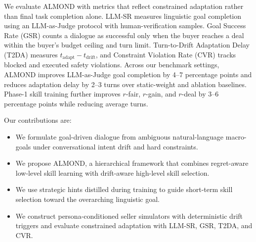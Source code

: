 We evaluate ALMOND with metrics that reflect constrained adaptation rather
than final task completion alone. LLM-SR measures linguistic goal completion
using an LLM-as-Judge protocol with human-verification samples. Goal Success
Rate (GSR) counts a dialogue as successful only when the buyer reaches a deal
within the buyer's budget ceiling and turn limit. Turn-to-Drift Adaptation
Delay (T2DA) measures $t_{\mathrm{adapt}}-t_{\mathrm{drift}}$, and Constraint
Violation Rate (CVR) tracks blocked and executed safety violations. Across our
benchmark settings, ALMOND improves LLM-as-Judge goal completion by 4--7
percentage points and reduces adaptation delay by 2--3 turns over
static-weight and ablation baselines. Phase-1 skill training further improves
$r$-fair, $r$-gain, and $r$-deal by 3--6 percentage points while reducing
average turns.

Our contributions are:
\begin{itemize}
    \item We formulate goal-driven dialogue from ambiguous natural-language
    macro-goals under conversational intent drift and hard constraints.
    \item We propose ALMOND, a hierarchical framework that combines
    regret-aware low-level skill learning with drift-aware high-level skill
    selection.
    \item We use strategic hints distilled during training to guide short-term
    skill selection toward the overarching linguistic goal.
    \item We construct persona-conditioned seller simulators with deterministic
    drift triggers and evaluate constrained adaptation with LLM-SR, GSR, T2DA,
    and CVR.
\end{itemize}

